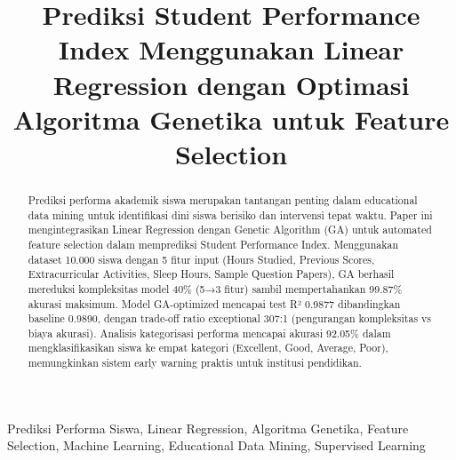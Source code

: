 \documentclass[conference]{IEEEtran}
\begin{document}
\title{Prediksi Student Performance Index Menggunakan Linear Regression dengan Optimasi Algoritma Genetika untuk Feature Selection}

\author{
\and
{}
\and
{}
}

\maketitle

\begin{abstract}
Prediksi performa akademik siswa merupakan tantangan penting dalam educational data mining untuk identifikasi dini siswa berisiko dan intervensi tepat waktu. Paper ini mengintegrasikan Linear Regression dengan Genetic Algorithm (GA) untuk automated feature selection dalam memprediksi Student Performance Index. Menggunakan dataset 10.000 siswa dengan 5 fitur input (Hours Studied, Previous Scores, Extracurricular Activities, Sleep Hours, Sample Question Papers), GA berhasil mereduksi kompleksitas model 40\% (5→3 fitur) sambil mempertahankan 99.87\% akurasi maksimum. Model GA-optimized mencapai test R² 0.9877 dibandingkan baseline 0.9890, dengan trade-off ratio exceptional 307:1 (pengurangan kompleksitas vs biaya akurasi). Analisis kategorisasi performa mencapai akurasi 92.05\% dalam mengklasifikasikan siswa ke empat kategori (Excellent, Good, Average, Poor), memungkinkan sistem early warning praktis untuk institusi pendidikan.
\end{abstract}

\begin{IEEEkeywords}
Prediksi Performa Siswa, Linear Regression, Algoritma Genetika, Feature Selection, Machine Learning, Educational Data Mining, Supervised Learning
\end{IEEEkeywords}
\end{document}
